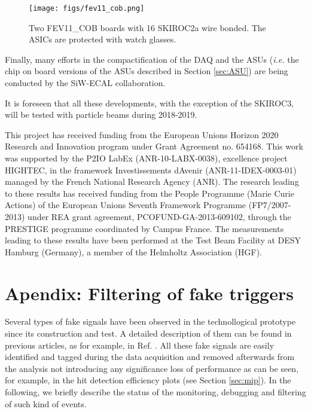 \documentclass[a4paper,11pt]{article}
\begin{document}
\begin{figure}[!t]
  \centering
    \texttt{[image: figs/fev11\_cob.png]} 
  \caption{Two FEV11\_COB boards with 16 SKIROC2a wire bonded. The ASICs are protected with watch glasses.}
\label{cob}
\end{figure}

Finally, many efforts in the compactification of
the DAQ and the ASUs ({\it i.e.} the chip on board versions of the 
ASUs described in Section \ref{sec:ASU}) are being
conducted by the SiW-ECAL collaboration.

It is foreseen that all these developments, with the exception of the SKIROC3, will be tested with particle beams during 2018-2019.


\acknowledgments

This project has received funding from the European Union{\textquotesingle}s Horizon 2020 Research and Innovation program under Grant Agreement no. 654168.
This work was supported by the P2IO LabEx (ANR-10-LABX-0038), excellence project HIGHTEC,
in the framework {\textquotesingle}Investissements d{\textquotesingle}Avenir{\textquotesingle}
(ANR-11-IDEX-0003-01) managed by the French National Research Agency (ANR).
The research leading to these results has received funding from the People Programme (Marie
Curie Actions) of the European Union{\textquotesingle}s Seventh Framework Programme (FP7/2007-2013)
under REA grant agreement, PCOFUND-GA-2013-609102, through the PRESTIGE
programme coordinated by Campus France.
The measurements leading to these results have been performed at the Test Beam Facility at DESY Hamburg (Germany), a member of the Helmholtz Association (HGF).

\appendix
\section{Apendix: Filtering of fake triggers}
\label{sec:retriggers}

Several types of fake signals have been observed in the technollogical prototype since its construction and test. A detailed description of them
can be found in previous articles, as for example, in Ref. \cite{Amjad:2014tha}. All these fake signals are easily identified
and tagged during the data acquisition and removed afterwards from the analysis
not introducing any significance loss of performance as can be seen, for example, in the hit detection efficiency plots (see Section \ref{sec:mip}).
In the following, we briefly describe the status of the monitoring, debugging and filtering
of such kind of events.
\end{document}
